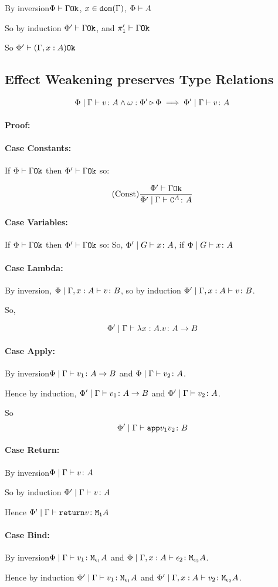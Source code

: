 \documentclass{report}
\newcommand\wrelw[2]{\wrel{\w}{#1}{#2}}
\newcommand\proof[0]{\paragraph{Proof:}}
\newcommand{\case}[1]{\paragraph{Case #1:}}
\newcommand\bi[0]{By inversion}
\begin{document}
\bi $\Phi\vdash \Gamma \texttt{Ok}$, $x\in\texttt{dom}(\Gamma)$, $\Phi\vdash A$

So by induction $\Phi'\vdash \Gamma \texttt{Ok}$, and $\pi_1'\vdash \Gamma \texttt{Ok}$

So $\Phi'\vdash (\Gamma, x: A) \texttt{Ok}$

\subsection{Effect Weakening preserves Type Relations}

\begin{equation}
    \gpetyperelation{v}{A} \wedge \wrelw{\P'}{\P} \implies \etyperelation{\P'}{\G}{v}{A}
\end{equation}
\proof
\case{Constants}
If $\Phi\vdash \Gamma \texttt{Ok}$ then $\Phi'\vdash \Gamma \texttt{Ok}$ so:

\begin{equation}
    (\text{Const}) \frac{\Phi'\vdash \Gamma \texttt{Ok}}{\Phi'\mid\Gamma \vdash \texttt{C}^{A} \colon A}
\end{equation}

\case{Variables}
If $\Phi\vdash \Gamma \texttt{Ok}$ then $\Phi'\vdash \Gamma \texttt{Ok}$ so:
So, $\Phi'\mid G \vdash x \colon A$, if $\Phi\mid G \vdash x \colon A$
\case{Lambda}
\bi, $\Phi\mid\Gamma, x: A \vdash v \colon B$, so by induction $\Phi'\mid\Gamma, x: A \vdash v \colon B$.

So,

\begin{equation}
    \Phi'\mid\Gamma \vdash \lambda x : A. v \colon A\rightarrow B
\end{equation}

\case{Apply}
\bi $\Phi\mid\Gamma \vdash v_1 \colon A\rightarrow B$ and $\Phi\mid\Gamma \vdash v_2 \colon A$.

Hence by induction,
$\Phi'\mid\Gamma \vdash v_1 \colon A\rightarrow B$ and $\Phi'\mid\Gamma \vdash v_2 \colon A$.

So $$\Phi'\mid\Gamma \vdash \texttt{app}{v_1}{v_2} \colon B$$

\case{Return}

\bi $\Phi\mid\Gamma \vdash v \colon A$ 

So by induction $\Phi'\mid\Gamma \vdash v \colon A$

Hence $\Phi'\mid\Gamma \vdash \texttt{return} v \colon \texttt{M}_{\texttt{1}}{A}$

\case{Bind}

\bi $\Phi\mid\Gamma \vdash v_1 \colon \texttt{M}_{\epsilon_1}{A}$ and $\Phi\mid\Gamma, x: A \vdash \epsilon_2 \colon \texttt{M}_{\epsilon_2}{A}$.

Hence by induction $\Phi'\mid\Gamma \vdash v_1 \colon \texttt{M}_{\epsilon_1}{A}$ and $\Phi'\mid\Gamma, x: A \vdash v_2 \colon \texttt{M}_{\epsilon_2}{A}$.
\end{document}

